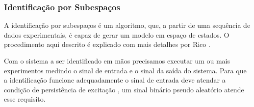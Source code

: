 %
%
%
%
%

\subsubsection {Identificação por Subespaços}
A identificação por subespaços é um algoritmo, que, a partir de uma sequência de dados experimentais, é capaz de gerar um modelo em espaço de estados. O procedimento aqui descrito é explicado com mais detalhes por Rico \cite{ricco2012}.


Com o sistema a ser identificado em mãos precisamos executar um ou mais experimentos medindo o sinal de entrada e o sinal da saída do sistema. Para que a identificação funcione adequadamente o sinal de entrada deve atendar a condição de persistência de excitação \cite{katayama2005}, um sinal binário pseudo aleatório atende esse requisito.


